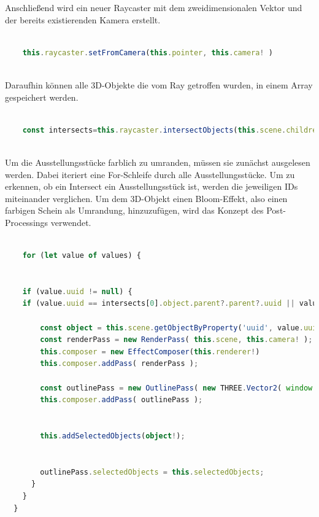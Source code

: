 Anschließend wird ein neuer Raycaster mit dem zweidimensionalen Vektor und der bereits existierenden Kamera erstellt. 

\begin{lstlisting}[caption={Neuen Raycaster anlegen},language=TypeScript]
    
    this.raycaster.setFromCamera(this.pointer, this.camera! )
    
\end{lstlisting}

Daraufhin können alle 3D-Objekte die vom Ray getroffen wurden, in einem Array gespeichert werden.

\begin{lstlisting}[caption={Intersected Objects auslesen},language=TypeScript]
    
    const intersects=this.raycaster.intersectObjects(this.scene.children)
    
\end{lstlisting}

Um die Ausstellungsstücke farblich zu umranden, müssen sie zunächst ausgelesen werden. Dabei iteriert eine For-Schleife durch alle Ausstellungsstücke. Um zu erkennen, ob ein Intersect ein Ausstellungsstück ist, werden die jeweiligen IDs miteinander verglichen. Um dem 3D-Objekt einen Bloom-Effekt, also einen farbigen Schein als Umrandung, hinzuzufügen, wird das Konzept des Post-Processings verwendet.

\begin{lstlisting}[caption={Intersects als Ausstellungsstück identifizieren},language=TypeScript]
    
    for (let value of values) {


    if (value.uuid != null) {
    if (value.uuid == intersects[0].object.parent?.parent?.uuid || value.uuid == intersects[0].object.uuid) {

        const object = this.scene.getObjectByProperty('uuid', value.uuid);
        const renderPass = new RenderPass( this.scene, this.camera! );
        this.composer = new EffectComposer(this.renderer!)
        this.composer.addPass( renderPass );
    
        const outlinePass = new OutlinePass( new THREE.Vector2( window.innerWidth, window.innerHeight ), this.scene, this.camera! );
        this.composer.addPass( outlinePass );


        this.addSelectedObjects(object!);


        outlinePass.selectedObjects = this.selectedObjects;
      }
    }
  }

\end{lstlisting}

